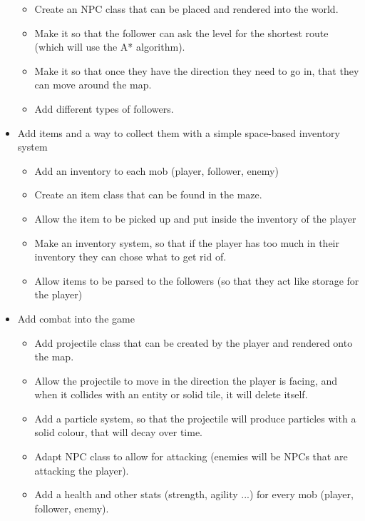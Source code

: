 \documentclass[../Main.tex]{subfiles}
\begin{document}
\begin{itemize}
                \begin{itemize}
                    \item Create an NPC class that can be placed and rendered into the world.
                    \item Make it so that the follower can ask the level for the shortest route (which will use the A* algorithm).
                    \item Make it so that once they have the direction they need to go in, that they can move around the map.
                    \item Add different types of followers.
                \end{itemize}
            \item Add items and a way to collect them with a simple space-based inventory system
                \begin{itemize}
                    \item Add an inventory to each mob (player, follower, enemy)
                    \item Create an item class that can be found in the maze.
                    \item Allow the item to be picked up and put inside the inventory of the player
                    \item Make an inventory system, so that if the player has too much in their inventory they can chose what to get rid of.
                    \item Allow items to be parsed to the followers (so that they act like storage for the player)
                \end{itemize}
            \item Add combat into the game
                \begin{itemize}
                    \item Add projectile class that can be created by the player and rendered onto the map.
                    \item Allow the projectile to move in the direction the player is facing, and when it collides with an entity or solid tile, it will delete itself.
                    \item Add a particle system, so that the projectile will produce particles with a solid colour, that will decay over time.
                    \item Adapt NPC class to allow for attacking (enemies will be NPCs that are attacking the player).
                    \item Add a health and other stats (strength, agility ...) for every mob (player, follower, enemy).

\end{itemize}
\end{itemize}
\end{document}
